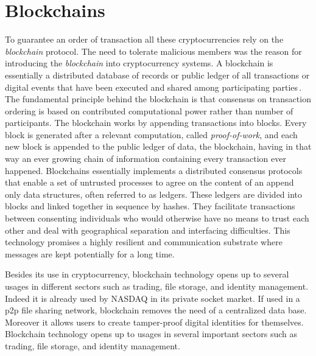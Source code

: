 \documentclass[USenglish]{uit-thesis}
\begin{document}
\section{Blockchains}
\label{sec:blockchains}
To guarantee an order of transaction all these
cryptocurrencies rely on the \emph{blockchain} protocol.
The need to tolerate malicious members was the reason for introducing
the \emph{blockchain} into cryptocurrency systems.
A blockchain is essentially a distributed
database of records or public ledger of all transactions or
digital events that have been executed and
shared among participating parties\,\cite{crosby2016blockchain}.
The fundamental principle  behind the blockchain is that
consensus on transaction ordering is based on 
contributed computational power rather than number of participants. 
The blockchain works by appending transactions into blocks.
Every block is generated after a relevant computation, called
\emph{proof-of-work}, and each new block is
appended to the public ledger of data, the blockchain, having in
that way an ever growing chain of information
containing every transaction ever happened.
Blockchains essentially implements a distributed
consensus protocols that enable a set of untrusted
processes to agree on the content of an append only data structures,
often referred to as ledgers. 
These ledgers are divided into blocks and linked together in sequence by hashes. 
They facilitate transactions between consenting individuals
who would otherwise have no means to trust each other and
deal with geographical separation and interfacing difficulties.
This technology promises a highly resilient and
communication substrate where messages are kept potentially for a long time.

Besides its use in cryptocurrency, blockchain technology
opens up to several usages in different sectors such as
trading, file storage, and identity management. Indeed it is already
used by NASDAQ in its private socket market.  If used in a \gls{p2p}
file sharing network, blockchain removes the need of a centralized
data base. Moreover it allows users to create
tamper-proof digital identities for themselves.
Blockchain technology opens up to usages in several important sectors
such as trading, file storage, and identity management.
\end{document}
